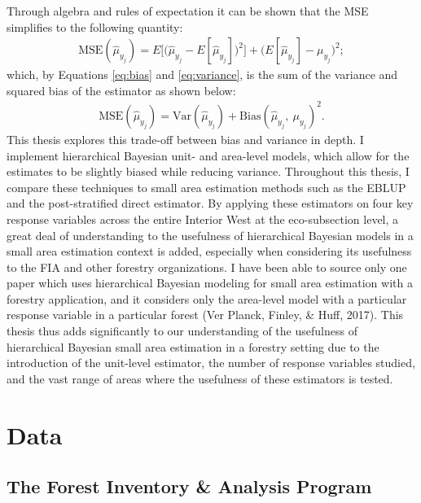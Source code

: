 \documentclass[12pt,twoside]{reedthesis}
\begin{document}
Through algebra and rules of expectation it can be shown that the MSE simplifies to the following quantity:
\begin{align}
\text{MSE}(\hat\mu_{y_j}) = E\Big[\Big(\hat\mu_{y_j} - E[\hat\mu_{y_j}]\Big)^2 \Big] + \Big(E[\hat\mu_{y_j}] - \mu_{y_j}\Big)^2;
\end{align}
which, by Equations \eqref{eq:bias} and \eqref{eq:variance}, is the sum of the variance and squared bias of the estimator as shown below:
\begin{align}
\text{MSE}(\hat\mu_{y_j}) = \text{Var}(\hat\mu_{y_j}) + \text{Bias}(\hat\mu_{y_j},~ \mu_{y_j})^2.
\end{align}
This thesis explores this trade-off between bias and variance in depth. I implement hierarchical Bayesian unit- and area-level models, which allow for the estimates to be slightly biased while reducing variance. Throughout this thesis, I compare these techniques to small area estimation methods such as the EBLUP and the post-stratified direct estimator. By applying these estimators on four key response variables across the entire Interior West at the eco-subsection level, a great deal of understanding to the usefulness of hierarchical Bayesian models in a small area estimation context is added, especially when considering its usefulness to the FIA and other forestry organizations. I have been able to source only one paper which uses hierarchical Bayesian modeling for small area estimation with a forestry application, and it considers only the area-level model with a particular response variable in a particular forest (Ver Planck, Finley, \& Huff, 2017). This thesis thus adds significantly to our understanding of the usefulness of hierarchical Bayesian small area estimation in a forestry setting due to the introduction of the unit-level estimator, the number of response variables studied, and the vast range of areas where the usefulness of these estimators is tested.

\hypertarget{data}{%
\chapter{Data}\label{data}}

\hypertarget{the-forest-inventory-analysis-program}{%
\section{The Forest Inventory \& Analysis Program}\label{the-forest-inventory-analysis-program}}
\end{document}
